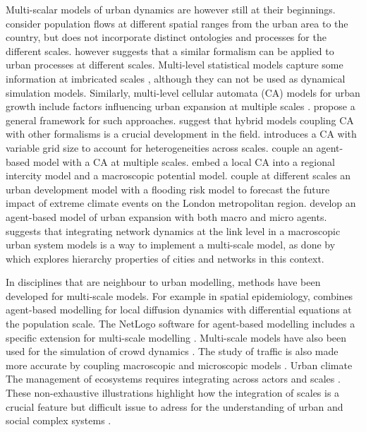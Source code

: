 \documentclass[referee,lineno,pdflatex,sn-apa]{sn-jnl}
\begin{document}
Multi-scalar models of urban dynamics are however still at their beginnings. \cite{murcio2015urban} consider population flows at different spatial ranges from the urban area to the country, but does not incorporate distinct ontologies and processes for the different scales. \cite{batty2005agents} however suggests that a similar formalism can be applied to urban processes at different scales. Multi-level statistical models capture some information at imbricated scales \citep{shu2020modelling}, although they can not be used as dynamical simulation models. Similarly, multi-level cellular automata (CA) models for urban growth include factors influencing urban expansion at multiple scales \citep{xu2019directional}. \cite{cheng2003modelling} propose a general framework for such approaches. \cite{torrens2001cellular} suggest that hybrid models coupling CA with other formalisms is a crucial development in the field. \cite{white2006modeling} introduces a CA with variable grid size to account for heterogeneities across scales. \cite{zhu2020dynamic} couple an agent-based model with a CA at multiple scales. \cite{yu2018modeling} embed a local CA into a regional intercity model and a macroscopic potential model. \cite{ford2019multi} couple at different scales an urban development model with a flooding risk model to forecast the future impact of extreme climate events on the London metropolitan region. \cite{xu2020urban} develop an agent-based model of urban expansion with both macro and micro agents. \cite{raimbault:halshs-02013006} suggests that integrating network dynamics at the link level in a macroscopic urban system models is a way to implement a multi-scale model, as done by \cite{raimbault2020hierarchy} which explores hierarchy properties of cities and networks in this context.

In disciplines that are neighbour to urban modelling, methods have been developed for multi-scale models. For example in spatial epidemiology, \cite{banos2015importance} combines agent-based modelling for local diffusion dynamics with differential equations at the population scale. The NetLogo software for agent-based modelling includes a specific extension for multi-scale modelling \cite{hjorth2020levelspace}. Multi-scale models have also been used for the simulation of crowd dynamics \cite{crociani2016multi}. The study of traffic is also made more accurate by coupling macroscopic and microscopic models \citep{boulet2020coupling,joueiai2014multiscale}.
Urban climate \citep{rasheed2009multiscale}
The management of ecosystems requires integrating across actors and scales \citep{belem2013organizational}. These non-exhaustive illustrations highlight how the integration of scales is a crucial feature but difficult issue to adress for the understanding of urban and social complex systems \citep{chavalarias2009french}.
\end{document}
